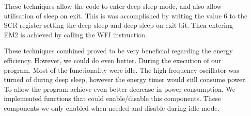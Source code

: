These techniques allow the code to enter deep sleep mode, and also allow utilisation of sleep on exit. This is was accomplished by writing the value 6 to the SCR register setting the deep sleep and deep sleep on exit bit. Then entering EM2 is achieved by calling the WFI instruction.

These techniques combined proved to be very beneficial regarding the energy efficiency. However, we could do even better. During the execution of our program. Most of the functionality were idle. The high frequency oscillator was turned of during deep sleep, however the energy timer would still consume power. To allow the program achieve even better decrease in power consumption. We implemented functions that could enable/disable this components. These components we only enabled when needed and disable during idle mode. 



 

  





   



  
       

 



